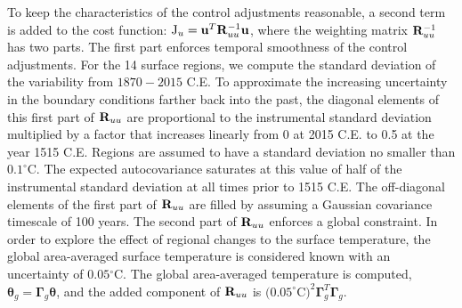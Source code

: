 \documentclass[12pt]{article}
\begin{document}
To keep the characteristics of the control adjustments reasonable,
a second term is added to the cost function:
$\mbox{J}_u = {\bf u}^T {\bf R}_{uu}^{-1} {\bf u}$,
where the weighting matrix ${\bf R}_{uu}^{-1}$ has two parts.
The first part enforces temporal smoothness of the control adjustments.
For the 14 surface regions, we compute the standard deviation of the variability from $1870-2015$ C.E. To approximate the increasing uncertainty in the boundary conditions farther back into the past, the diagonal elements of this first part of ${\bf R}_{uu}$ are proportional to the instrumental standard deviation multiplied by a factor that increases linearly from 0 at 2015 C.E. to 0.5 at the year 1515 C.E. Regions are assumed to have a standard deviation no smaller than $0.1^{\circ}$C. The expected autocovariance saturates at this value of half of the instrumental standard deviation at all times prior to 1515 C.E. The off-diagonal elements of the first part of ${\bf R}_{uu}$ are filled by assuming a Gaussian covariance timescale of 100 years. The second part of ${\bf R}_{uu}$ enforces a global constraint. In order to explore the effect of regional changes to the surface temperature, the global area-averaged surface temperature is considered known with an uncertainty of $0.05{^\circ}$C. The global area-averaged temperature is computed, ${\boldsymbol \theta}_g = {\boldsymbol \Gamma}_g {\boldsymbol \theta}$, and the added component of ${\bf R}_{uu}$ is  $(0.05^{\circ}$C$)^2 {\boldsymbol \Gamma}^T_g{\boldsymbol \Gamma}_g$.
 


\end{document}

